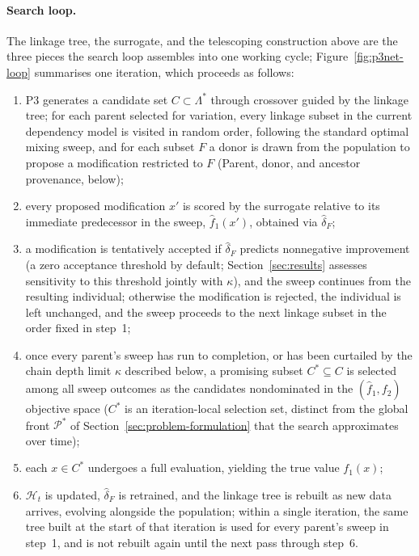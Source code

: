 \paragraph{Search loop.} The linkage tree, the surrogate, and the telescoping construction above are the three pieces the search loop assembles into one working cycle; Figure~\ref{fig:p3net-loop} summarises one iteration, which proceeds as follows:
\begin{enumerate}
    \item P3 generates a candidate set $C \subset \Lambda^*$ through crossover guided by the linkage tree; for each parent selected for variation, every linkage subset in the current dependency model is visited in random order, following the standard optimal mixing sweep, and for each subset $F$ a donor is drawn from the population to propose a modification restricted to $F$ (Parent, donor, and ancestor provenance, below);
    \item every proposed modification $x'$ is scored by the surrogate relative to its immediate predecessor in the sweep, $\hat{f}_1(x')$, obtained via $\hat{\delta}_F$;
    \item a modification is tentatively accepted if $\hat{\delta}_F$ predicts nonnegative improvement (a zero acceptance threshold by default; Section~\ref{sec:results} assesses sensitivity to this threshold jointly with $\kappa$), and the sweep continues from the resulting individual; otherwise the modification is rejected, the individual is left unchanged, and the sweep proceeds to the next linkage subset in the order fixed in step~1;
    \item once every parent's sweep has run to completion, or has been curtailed by the chain depth limit $\kappa$ described below, a promising subset $C^* \subseteq C$ is selected among all sweep outcomes as the candidates nondominated in the $(\hat{f}_1, f_2)$ objective space ($C^*$ is an iteration-local selection set, distinct from the global front $\mathcal{P}^*$ of Section~\ref{sec:problem-formulation} that the search approximates over time);
    \item each $x \in C^*$ undergoes a full evaluation, yielding the true value $f_1(x)$;
    \item $\mathcal{H}_t$ is updated, $\hat{\delta}_F$ is retrained, and the linkage tree is rebuilt as new data arrives, evolving alongside the population; within a single iteration, the same tree built at the start of that iteration is used for every parent's sweep in step~1, and is not rebuilt again until the next pass through step~6.
\end{enumerate}

